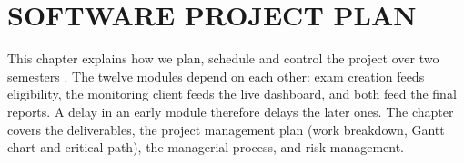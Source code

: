 \chapter{SOFTWARE PROJECT PLAN}
\label{chap:spp}

This chapter explains how we plan, schedule and control the project over two semesters \cite{pmbok6}. The twelve modules depend on each other: exam creation feeds eligibility, the monitoring client feeds the live dashboard, and both feed the final reports. A delay in an early module therefore delays the later ones. The chapter covers the deliverables, the project management plan (work breakdown, Gantt chart and critical path), the managerial process, and risk management.
